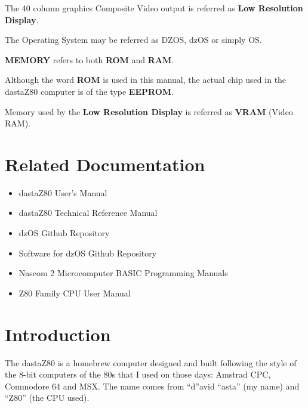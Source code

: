 \documentclass[a4paper,11pt]{article}
\begin{document}
    The 40 column graphics Composite Video output is referred as \textbf{Low
    Resolution Display}.
    
    The Operating System may be referred as DZOS, dzOS or simply OS.

    \textbf{MEMORY} refers to both \textbf{ROM} and \textbf{RAM}.

    Although the word \textbf{ROM} is used in this manual, the actual chip used
    in the dastaZ80 computer is of the type \textbf{EEPROM}.

    Memory used by the \textbf{Low Resolution Display} is referred as
    \textbf{VRAM} (Video RAM).

    \pagebreak
    \section*{Related Documentation}
    \begin{itemize}
        \item dastaZ80 User's Manual\cite{dastaz80userman}
        \item dastaZ80 Technical Reference Manual\cite{dastaz80techman}
        \item dzOS Github Repository\cite{dastaZ80github}
        \item Software for dzOS Github Repository\cite{dastaZ80githubsoft}
        \item Nascom 2 Microcomputer BASIC Programming Manuals\cite{nascombasic}
        \item Z80 Family CPU User Manual\cite{z80manual}
    \end{itemize}

    \pagebreak
    \tableofcontents

    \pagebreak
    \pagestyle{fancy}
    \fancyhf{}
    \fancyfoot[R]{\thepage}
    \setcounter{page}{1}
    \section{Introduction}
    The dastaZ80 is a homebrew computer designed and built following the style
    of the 8-bit computers of the 80s that I used on those days: Amstrad CPC,
    Commodore 64 and MSX. The name comes from “d”avid “asta” (my name) and 
    “Z80” (the CPU used).
\end{document}
